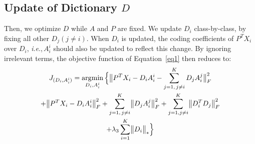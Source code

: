 \documentclass[journal]{IEEEtran}
\newcommand{\ie}{\textit{i}.\textit{e}.,\,}
\DeclareMathOperator*{\argmin}{\arg\!\min}
\DeclarePairedDelimiter\norm{\lVert}{\rVert}
\begin{document}
\subsection{Update of Dictionary $D$}
Then, we optimize $D$ while $A$ and $P$ are fixed. We update $D_i$ class-by-class, by fixing all other $D_j ( j \neq i)$. When $D_i$ is updated, the coding coefficients of $ P^T X_i$ over $D_i$, \ie $A_i^i$ should also be updated to reflect this change. By ignoring irrelevant terms, the objective function of Equation~\eqref{eq1} then reduces to:
\begin{gather}
J_{(D_i,A_i^i)} = \argmin_{D_i,A_i^i} \Big\{ \norm[\big]{P^T X_i - D_i A_i^i - \sum\limits_{j=1 , \, j \neq i}^K D_j A_i^j}_{F}^2 
\label{eq15} \\ \notag
+ \norm[\big]{P^T X_i - D_i A_i^i}_{F}^2 + \sum\limits_{j=1 , \, j \neq i}^K \norm[\big]{D_j A_i^j}_{F}^2 
+ \sum_{\substack{j=1, j \neq i}}^K \norm[\big]{D_i^T D_j}_{F}^2 
\\ \notag
+ \lambda_3 \sum\limits_{i=1}^K  \norm[\big]{D_i}_{*} \Big\} 
\end{gather}
\end{document}
